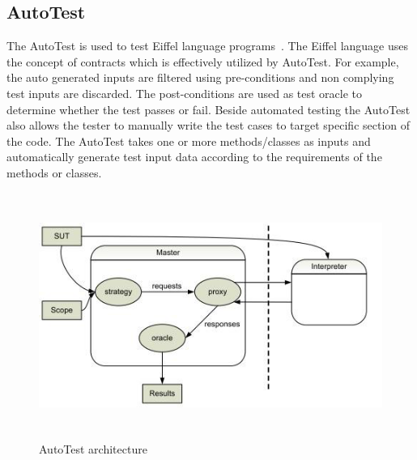 \subsection{AutoTest} \label{autotest_2}
The AutoTest is used to test Eiffel language programs~\cite{ciupa2007automatic}. The Eiffel language uses the concept of contracts which is effectively utilized by AutoTest. For example, the auto generated inputs are filtered using pre-conditions and non complying test inputs are discarded. The post-conditions are used as test oracle to determine whether the test passes or fail. Beside automated testing the AutoTest also allows the tester to manually write the test cases to target specific section of the code. The AutoTest takes one or more methods/classes as inputs and automatically generate test input data according to the requirements of the methods or classes.
\bigskip
\begin{figure}[h]
	\centering
	\includegraphics[width=14cm, height=8cm]{chapter2/autotest.png}
	\caption{AutoTest architecture~\cite{leitner2007reconciling}}
	\label{fig:autotest}
\end{figure}

